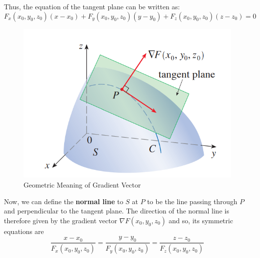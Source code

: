 \documentclass[math,code]{amznotes}
\theoremstyle{remark}
\begin{document}
Thus, the equation of the tangent plane can be written as:
\begin{equation} \label{eq:equation-of-tangent-planes-general}
    F_x(x_0,y_0,z_0)(x-x_0) + F_y(x_0,y_0,z_0)(y-y_0) +F_z(x_0,y_0,z_0)(z-z_0) = 0
\end{equation}
\begin{figure}[H]
    \centering
    \includegraphics[width=0.5\linewidth]{images/geometric-meaing-of-gradient-vector.png}
    \caption{Geometric Meaning of Gradient Vector}
    \label{fig:geometric-meaing-of-gradient-vector}
\end{figure}
Now, we can define the {\color{red} \textbf{normal line}} to $S$ at $P$ to be the line passing through $P$ and perpendicular to the tangent plane. The direction of the normal line is therefore given by the gradient vector $\nabla F(x_0,y_0,z_0)$ and so, its symmetric equations are
\begin{displaymath}
    \frac{x-x_0}{F_x(x_0,y_0,z_0)} = \frac{y-y_0}{F_y(x_0,y_0,z_0)} = \frac{z-z_0}{F_z(x_0,y_0,z_0)}
\end{displaymath}
\end{document}
